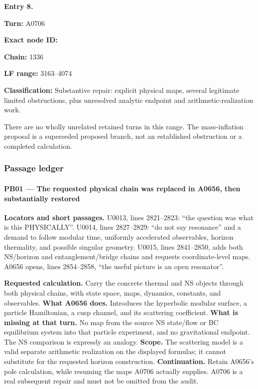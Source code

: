 \documentclass[10pt,a4paper,oneside]{report}
\begin{document}
\textbf{Entry 8.}

\textbf{Turn:} A0706

\textbf{Exact node ID:}
\protect{}

\textbf{Chain:} 1336

\textbf{LF range:} 3163--4074

\textbf{Classification:} Substantive repair: explicit physical maps,
several legitimate limited obstructions, plus unresolved analytic
endpoint and arithmetic-realization work.

There are no wholly unrelated retained turns in this range. The
mass-inflation proposal is a superseded proposed branch, not an
established obstruction or a completed calculation.

\subsubsection{Passage ledger}\label{passage-ledger-1}

\paragraph{PB01 --- The requested physical chain was replaced in A0656,
then substantially
restored}\label{pb01-the-requested-physical-chain-was-replaced-in-a0656-then-substantially-restored}

\textbf{Locators and short passages.} U0013, lines 2821--2823: ``the
question was what is this PHYSICALLY''. U0014, lines 2827--2829: ``do
not say resonance'' and a demand to follow modular time, uniformly
accelerated observables, horizon thermality, and possible singular
geometry. U0015, lines 2841--2850, adds both NS/horizon and
entanglement/bridge chains and requests coordinate-level maps. A0656
opens, lines 2854--2858, ``the useful picture is an open resonator''.

\textbf{Requested calculation.} Carry the concrete thermal and NS
objects through both physical chains, with state space, maps, dynamics,
constants, and observables. \textbf{What A0656 does.} Introduces the
hyperbolic modular surface, a particle Hamiltonian, a cusp channel, and
its scattering coefficient. \textbf{What is missing at that turn.} No
map from the source NS state/flow or BC equilibrium system into that
particle experiment, and no gravitational endpoint. The NS comparison is
expressly an analogy. \textbf{Scope.} The scattering model is a valid
separate arithmetic realization on the displayed formulas; it cannot
substitute for the requested horizon construction.
\textbf{Continuation.} Retain A0656's pole calculation, while resuming
the maps A0706 actually supplies. A0706 is a real subsequent repair and
must not be omitted from the audit.
\end{document}
